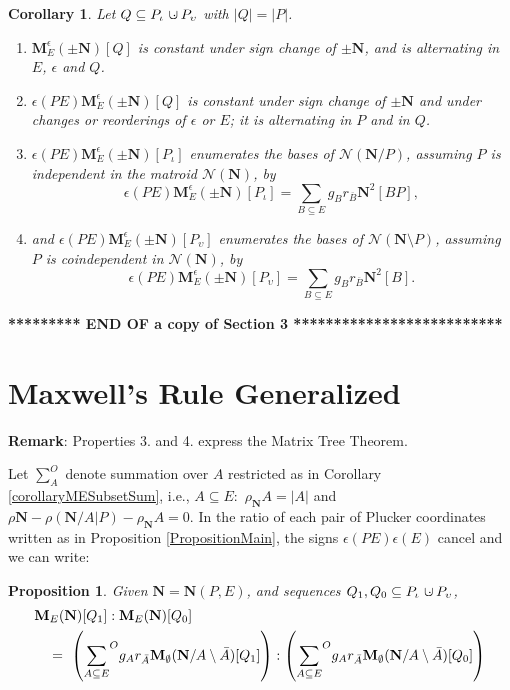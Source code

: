 \documentclass[12pt]{article}
\newtheorem{proposition}[theorem]{Proposition}
\newtheorem{corollary}[theorem]{Corollary}
\theoremstyle{definition}
\newcommand{\Remark}{\textbf{Remark}}
\newcommand{\dunion}
{\mbox{\hbox{\hskip6pt$\cdot$\hskip-5.50pt$\cup$\hskip2pt}}}
\newcommand{\scomp}[1]{\ensuremath{\overline{#1}}}
\newcommand{\Is}{\ensuremath{\iota}}
\newcommand{\Vs}{\ensuremath{\upsilon}}
\newcommand{\rank}{{\rho}}%
\newcommand{\Card}[1]{\ensuremath{{\left|#1\right|}}}
\newcommand{\ext}[1]{\ensuremath{\mathbf{#1}}}
\begin{document}
\begin{corollary}
\label{PairsBasisCountCorollary}
Let $Q\subseteq P_{\Is}\dunion P_{\Vs}$ with $\Card{Q}=\Card{P}$.
\begin{enumerate}
\item $\ext{M}^\epsilon_E(\pm \ext{N})[Q]$ is constant under sign change of
$\pm \ext{N}$, and is alternating in $E$, $\epsilon$ and $Q$.
\item $\epsilon(PE)\ext{M}^\epsilon_E(\pm \ext{N})[Q]$ 
is constant under sign
change of $\pm \ext{N}$ and under changes or reorderings of 
$\epsilon$ or  $E$; it
is alternating in $P$ and in $Q$.
\item $\epsilon(PE)\ext{M}^\epsilon_E(\pm \ext{N})[P_{\Is}]$
enumerates the bases of
$\mathcal{N}(\ext{N}/P)$, assuming $P$ is independent in the matroid 
$\mathcal{N}(\ext{N})$, by
\[
\epsilon(PE)\ext{M}^\epsilon_E(\pm \ext{N})[P_{\Is}]=
\sum_{B\subseteq E} g_Br_{\scomp{B}}\ext{N}^2[BP],
\]
\item and $\epsilon(PE)\ext{M}^\epsilon_E(\pm \ext{N})[P_{\Vs}]$ 
enumerates the bases of
$\mathcal{N}(\ext{N}\setminus P)$,  
assuming $P$ is coindependent in 
$\mathcal{N}(\ext{N})$, by\[
\epsilon(PE)\ext{M}^\epsilon_E(\pm \ext{N})[P_{\Vs}]=
\sum_{B\subseteq E} g_Br_{\scomp{B}}\ext{N}^2[B].
\]
\end{enumerate}
\end{corollary}



\noindent
{\bf **********  END OF a copy of Section 3 **************************}




\newpage
\section{Maxwell's Rule Generalized}


\Remark: Properties 3. and 4. express the Matrix Tree Theorem.

Let $\sum_A^O$ denote summation over $A$ restricted as in Corollary \ref{corollaryMESubsetSum}, i.e.,
$A\subseteq E:$ $\rank_{\ext{N}}{A}=\Card{A}$ and 
$\rank{\ext{N}}-\rank{(\ext{N}/A|P)}- \rank_{\ext{N}}{A}=0$.
In the ratio of each pair of Plucker coordinates written as in 
Proposition \ref{PropositionMain}, the signs $\epsilon(PE)\epsilon(E)$
cancel and we can write:


\begin{proposition}Given $\ext{N}=\ext{N}(P,E)$,
and sequences 
$Q_1, Q_0\subseteq P_{\Is}\dunion P_{\Vs}$,
\begin{eqnarray}
\lefteqn{\ext{M}_E(\ext{N})[Q_1]:\ext{M}_E(\ext{N})[Q_0]}
\nonumber\\
& & {}=\
\left({\sum_{A\subseteq E}}^O g_Ar_{\bar{A}}
\ext{M}_{\emptyset}(\ext{N}/A\setminus\bar{A})[Q_1]\right)
:
\left({\sum_{A\subseteq E}}^O g_Ar_{\bar{A}}
\ext{M}_{\emptyset}(\ext{N}/A\setminus\bar{A})[Q_0]\right)
\end{eqnarray}
\end{proposition}
\end{document}
